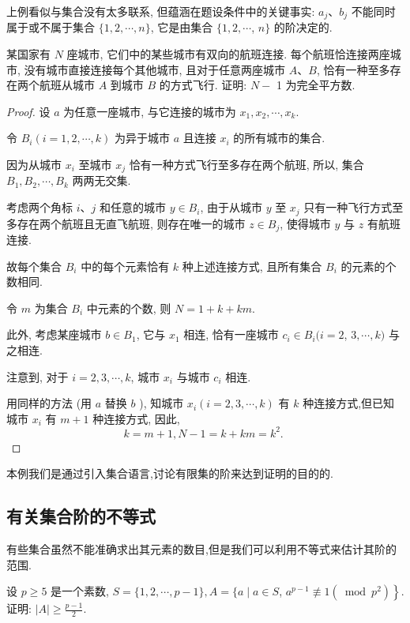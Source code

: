\begin{note}
	上例看似与集合没有太多联系, 但蕴涵在题设条件中的关键事实: $a_{j} 、 b_{j}$ 不能同时属于或不属于集合 $\{1,2, \cdots, n\}$, 它是由集合 $\{1,2, \cdots$, $n\}$ 的阶决定的.
\end{note}

\begin{example}
	某国家有 $N$ 座城市, 它们中的某些城市有双向的航班连接. 每个航班恰连接两座城市, 没有城市直接连接每个其他城市, 且对于任意两座城市 $A 、 B$, 恰有一种至多存在两个航班从城市 $A$ 到城市 $B$ 的方式飞行. 证明: $N-$ 1 为完全平方数.
\end{example}

\begin{proof}
	设 $a$ 为任意一座城市, 与它连接的城市为 $x_{1}, x_{2}, \cdots, x_{k}$.

	令 $B_{i}(i=1,2, \cdots, k)$ 为异于城市 $a$ 且连接 $x_{i}$ 的所有城市的集合.

	因为从城市 $x_{i}$ 至城市 $x_{j}$ 恰有一种方式飞行至多存在两个航班, 所以, 集合 $B_{1}, B_{2}, \cdots, B_{k}$ 两两无交集.

	考虑两个角标 $i 、 j$ 和任意的城市 $y \in B_{i}$, 由于从城市 $y$ 至 $x_{j}$ 只有一种飞行方式至多存在两个航班且无直飞航班, 则存在唯一的城市 $z \in B_{j}$, 使得城市 $y$ 与 $z$ 有航班连接.

	故每个集合 $B_{i}$ 中的每个元素恰有 $k$ 种上述连接方式, 且所有集合 $B_{i}$ 的元素的个数相同.

	令 $m$ 为集合 $B_{i}$ 中元素的个数, 则 $N=1+k+k m$.

	此外, 考虑某座城市 $b \in B_{1}$, 它与 $x_{1}$ 相连, 恰有一座城市 $c_{i} \in B_{i}(i=2$, $3, \cdots, k)$ 与之相连.

	注意到, 对于 $i=2,3, \cdots, k$, 城市 $x_{i}$ 与城市 $c_{i}$ 相连.

	用同样的方法 (用 $a$ 替换 $b$ ), 知城市 $x_{i}(i=2,3, \cdots, k)$ 有 $k$ 种连接方式,但已知城市 $x_{i}$ 有 $m+1$ 种连接方式, 因此,
	$$
		k=m+1, N-1=k+k m=k^{2} \text {. }
	$$
\end{proof}

\begin{note}
	本例我们是通过引入集合语言,讨论有限集的阶来达到证明的目的的.
\end{note}

\subsection{有关集合阶的不等式}
有些集合虽然不能准确求出其元素的数目,但是我们可以利用不等式来估计其阶的范围.
\begin{example}
	设 $p \geqslant 5$ 是一个素数, $S=\{1,2, \cdots, p-1\}, A=\{a \mid a \in S$, $\left.a^{p-1} \not \equiv 1\left(\bmod p^{2}\right)\right\}$. 证明: $|A| \geqslant \frac{p-1}{2}$.
\end{example}

